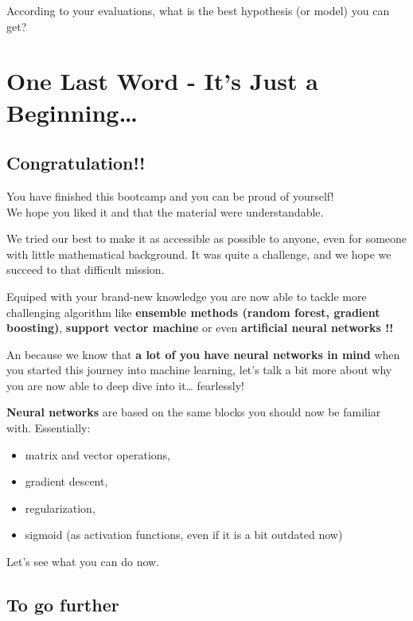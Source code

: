 \documentclass[]{article}
\begin{document}
According to your evaluations, what is the best hypothesis (or model)
you can get? \clearpage

\hypertarget{one-last-word---its-just-a-beginning}{%
\section{One Last Word - It's Just a
Beginning\ldots{}}\label{one-last-word---its-just-a-beginning}}

\hypertarget{congratulation}{%
\subsection{Congratulation!!}\label{congratulation}}

You have finished this bootcamp and you can be proud of yourself!\\
We hope you liked it and that the material were understandable.

We tried our best to make it as accessible as possible to anyone, even
for someone with little mathematical background. It was quite a
challenge, and we hope we succeed to that difficult mission.

Equiped with your brand-new knowledge you are now able to tackle more
challenging algorithm like \textbf{ensemble methods (random forest,
gradient boosting)}, \textbf{support vector machine} or even
\textbf{artificial neural networks !!}

An because we know that \textbf{a lot of you have neural networks in
mind} when you started this journey into machine learning, let's talk a
bit more about why you are now able to deep dive into it\ldots{}
fearlessly!

\textbf{Neural networks} are based on the same blocks you should now be
familiar with. Essentially:

\begin{itemize}
\item
  matrix and vector operations,
\item
  gradient descent,
\item
  regularization,
\item
  sigmoid (as activation functions, even if it is a bit outdated now)
\end{itemize}

Let's see what you can do now.

\hypertarget{to-go-further}{%
\subsection{To go further}\label{to-go-further}}
\end{document}
